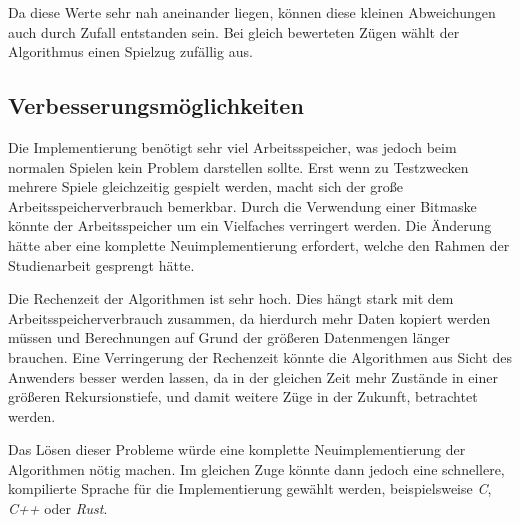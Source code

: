 \documentclass[11pt]{article}
\begin{document}
Da diese Werte sehr nah aneinander liegen, können diese kleinen
Abweichungen auch durch Zufall entstanden sein. Bei gleich bewerteten
Zügen wählt der Algorithmus einen Spielzug zufällig aus.

    \hypertarget{verbesserungsmuxf6glichkeiten}{%
\subsection{Verbesserungsmöglichkeiten}\label{verbesserungsmuxf6glichkeiten}}

Die Implementierung benötigt sehr viel Arbeitsspeicher, was jedoch beim
normalen Spielen kein Problem darstellen sollte. Erst wenn zu
Testzwecken mehrere Spiele gleichzeitig gespielt werden, macht sich der
große Arbeitsspeicherverbrauch bemerkbar. Durch die Verwendung einer
Bitmaske könnte der Arbeitsspeicher um ein Vielfaches verringert werden.
Die Änderung hätte aber eine komplette Neuimplementierung erfordert,
welche den Rahmen der Studienarbeit gesprengt hätte.

Die Rechenzeit der Algorithmen ist sehr hoch. Dies hängt stark mit dem
Arbeitsspeicherverbrauch zusammen, da hierdurch mehr Daten kopiert
werden müssen und Berechnungen auf Grund der größeren Datenmengen länger
brauchen. Eine Verringerung der Rechenzeit könnte die Algorithmen aus
Sicht des Anwenders besser werden lassen, da in der gleichen Zeit mehr
Zustände in einer größeren Rekursionstiefe, und damit weitere Züge in
der Zukunft, betrachtet werden.

Das Lösen dieser Probleme würde eine komplette Neuimplementierung der
Algorithmen nötig machen. Im gleichen Zuge könnte dann jedoch eine
schnellere, kompilierte Sprache für die Implementierung gewählt werden,
beispielsweise \emph{C}, \emph{C++} oder \emph{Rust}.


    
    
    
\end{document}
